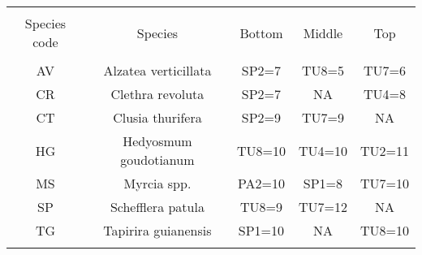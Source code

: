 
\begin{table}[!htbp] \centering 
  \caption{} 
  \label{species_elevcode_tally} 
\begin{tabular}{@{\extracolsep{5pt}} ccccc} 
\\[-1.8ex]\hline 
\hline \\[-1.8ex] 
Species code & Species & Bottom & Middle & Top \\ 
\hline \\[-1.8ex] 
AV & Alzatea verticillata & SP2=7 & TU8=5 & TU7=6 \\ 
CR & Clethra revoluta & SP2=7 & NA & TU4=8 \\ 
CT & Clusia thurifera & SP2=9 & TU7=9 & NA \\ 
HG & Hedyosmum goudotianum & TU8=10 & TU4=10 & TU2=11 \\ 
MS & Myrcia spp. & PA2=10 & SP1=8 & TU7=10 \\ 
SP & Schefflera patula & TU8=9 & TU7=12 & NA \\ 
TG & Tapirira guianensis & SP1=10 & NA & TU8=10 \\ 
\hline \\[-1.8ex] 
\end{tabular} 
\end{table} 
